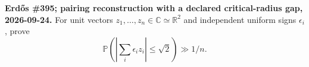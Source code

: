 \textbf{Erd\H{o}s \#395; pairing reconstruction with a declared critical-radius gap, 2026-09-24.}
For unit vectors $z_1,\ldots,z_n\in\mathbb C\simeq\mathbb R^2$ and independent uniform signs $\epsilon_i$, prove
\[
\mathbb P\!\left(\left|\sum_i\epsilon_i z_i\right|\leq\sqrt2\right)\gg1/n.
\]
